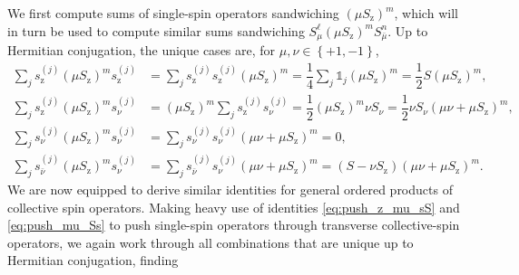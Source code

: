 \documentclass[aps,11pt,notitlepage,nofootinbib,longbibliography]{revtex4-1}
\newcommand{\f}[2]{\dfrac{#1}{#2}} %
\newcommand{\p}[1]{\left(#1\right)} %
\renewcommand{\set}[1]{\left\{#1\right\}} %
\newcommand{\z}{\text{z}}
\newcommand{\bmu}{{\bar\mu}}
\newcommand{\bnu}{{\bar\nu}}
\newcommand{\1}{\mathds{1}}
\begin{document}
We first compute sums of single-spin operators sandwiching
$\p{\mu S_\z}^m$, which will in turn be used to compute similar sums
sandwiching $S_\mu^\ell \p{\mu S_\z}^m S_\bmu^n$.  Up to Hermitian
conjugation, the unique cases are, for $\mu,\nu\in\set{+1,-1}$,
\begin{align}
  \sum_j s_\z^{(j)} \p{\mu S_\z}^m s_\z^{(j)}
  &= \sum_j s_\z^{(j)} s_\z^{(j)} \p{\mu S_\z}^m
  = \f14 \sum_j \1_j \p{\mu S_\z}^m
  = \f12 S \p{\mu S_\z}^m, \\
  \sum_j s_\z^{(j)} \p{\mu S_\z}^m s_\nu^{(j)}
  &= \p{\mu S_\z}^m \sum_j s_\z^{(j)} s_\nu^{(j)}
  = \f12 \p{\mu S_\z}^m \nu S_\nu
  = \f12 \nu S_\nu \p{\mu\nu+\mu S_\z}^m, \\
  \sum_j s_\nu^{(j)} \p{\mu S_\z}^m s_\nu^{(j)}
  &= \sum_j s_\nu^{(j)} s_\nu^{(j)} \p{\mu\nu+\mu S_\z}^m
  = 0, \\
  \sum_j s_\bnu^{(j)} \p{\mu S_\z}^m s_\nu^{(j)}
  &= \sum_j s_\bnu^{(j)} s_\nu^{(j)} \p{\mu\nu+\mu S_\z}^m
  = \p{S-\nu S_\z} \p{\mu\nu+\mu S_\z}^m.
\end{align}
We are now equipped to derive similar identities for general ordered
products of collective spin operators.  Making heavy use of identities
\eqref{eq:push_z_mu_sS} and \eqref{eq:push_mu_Ss} to push single-spin
operators through transverse collective-spin operators, we again work
through all combinations that are unique up to Hermitian conjugation,
finding
\end{document}
